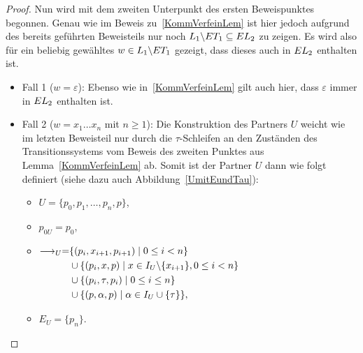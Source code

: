 \begin{proof}
  Nun wird mit dem zweiten Unterpunkt des ersten Beweispunktes begonnen. Genau
  wie im Beweis zu~\ref{KommVerfeinLem} ist hier jedoch aufgrund des bereits
  geführten Beweisteils nur noch $L_1\backslash ET _1\subseteq EL _2$ zu
  zeigen. Es wird also für ein beliebig gewähltes $w\in L_1\backslash ET _1$
  gezeigt, dass dieses auch in $EL _2$ enthalten ist.
  \begin{itemize}
    \item Fall 1 ($w=\varepsilon$): Ebenso wie in~\ref{KommVerfeinLem} gilt
      auch hier, dass $\varepsilon$ immer in $EL _2$ enthalten ist.
    \item Fall 2 ($w=x_1\dots x_n$ mit $n\geq 1$): Die Konstruktion des
      Partners $U$ weicht wie im letzten Beweisteil nur durch die
      $\tau$-Schleifen an den Zuständen des Transitionssystems vom Beweis des
      zweiten Punktes aus Lemma~\ref{KommVerfeinLem} ab. Somit ist der Partner
      $U$ dann wie folgt definiert (siehe dazu auch Abbildung~\ref{UmitEundTau}):
      \begin{itemize}
        \item $U=\{p_0,p_1,\dots ,p_n,p\}$,
        \item $p_{0U}=p_0$,
        \item $\begin{aligned}[t]
            \must _U=&\{(p_i,x_{i+1},p_{i+1})\mid 0\leq i< n\}\\
            &\cup\{(p_i,x,p)\mid x\in I_U\backslash\{x_{i+1}\},0\leq i < n\}\\
            &\cup\{(p_i,\tau ,p_i)\mid 0\leq i\leq n\}\\
            &\cup\{(p,\alpha ,p)\mid \alpha\in I_U\cup \{\tau\}\},
              \end{aligned}$
        \item $E_U=\{p_n\}$.
      \end{itemize}
      \begin{figure} [h!tbp]
      \begin{center}
\end{center}
\end{figure}
\end{itemize}
\end{proof}
